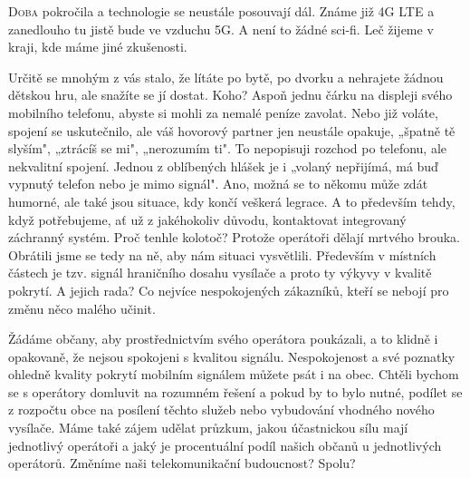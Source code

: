 \documentclass[10pt]{article}
\begin{document}
\begin{multicols}{2}{

\lettrine{D}{oba} pokročila a technologie se neustále posouvají dál. Známe již 4G LTE  a zanedlouho tu jistě bude ve vzduchu 5G. A není to žádné sci-fi. Leč žijeme v kraji, kde máme jiné zkušenosti.

Určitě se mnohým z vás stalo, že lítáte po bytě, po dvorku a nehrajete žádnou dětskou hru, ale snažíte se jí dostat. Koho? Aspoň jednu čárku na displeji svého mobilního telefonu, abyste si mohli za nemalé peníze zavolat. Nebo již voláte, spojení se uskutečnilo, ale váš hovorový partner jen neustále opakuje, „špatně tě slyším", „ztrácíš se mi", „nerozumím ti". To nepopisuji rozchod po telefonu, ale nekvalitní spojení. Jednou z oblíbených hlášek je i „volaný nepřijímá, má buď vypnutý telefon nebo je mimo signál". Ano, možná se to někomu může zdát humorné, ale také jsou situace, kdy končí veškerá legrace. A to především tehdy, když potřebujeme, ať už z jakéhokoliv důvodu, kontaktovat integrovaný záchranný systém. Proč tenhle kolotoč? Protože operátoři dělají mrtvého brouka. Obrátili jsme se tedy na ně, aby nám situaci vysvětlili. Především v místních částech je tzv. signál hraničního dosahu vysílače a proto ty výkyvy v kvalitě pokrytí. A jejich rada? Co nejvíce nespokojených zákazníků, kteří se nebojí pro změnu něco malého učinit. 

Žádáme občany, aby prostřednictvím svého operátora poukázali, a to klidně i opakovaně, že nejsou spokojeni s kvalitou signálu. Nespokojenost a své poznatky ohledně kvality pokrytí mobilním signálem můžete psát i na obec. Chtěli bychom se s operátory domluvit na rozumném řešení a pokud by to bylo nutné, podílet se z rozpočtu obce na posílení těchto služeb nebo vybudování vhodného nového vysílače. Máme také zájem udělat průzkum, jakou účastnickou sílu mají jednotlivý operátoři a jaký je procentuální podíl našich občanů u jednotlivých operátorů. Změníme naši telekomunikační budoucnost? Spolu?
}\end{multicols}
\closearticle
\end{document}
